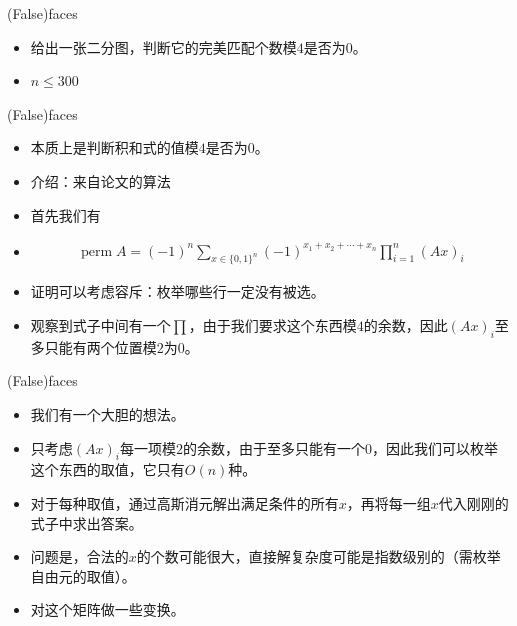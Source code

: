 \documentclass{beamer}
\begin{document}
\begin{frame}{(False)faces}
    \begin{itemize}
        \item 给出一张二分图，判断它的完美匹配个数模$4$是否为$0$。
        \item $n\leq 300$
    \end{itemize}
\end{frame}

\begin{frame}{(False)faces}
    \begin{itemize}
        \item 本质上是判断积和式的值模$4$是否为$0$。
        \item 介绍：来自论文的算法
        \item 首先我们有
        \item $$\begin{aligned}
            \operatorname{perm}A=(-1)^n\sum_{x\in\{0,1\}^n}(-1)^{x_1+x_2+\cdots +x_n}\prod_{i=1}^n(Ax)_i
        \end{aligned}$$
        \item 证明可以考虑容斥：枚举哪些行一定没有被选。
        \item 观察到式子中间有一个$\prod$，由于我们要求这个东西模$4$的余数，因此$(Ax)_i$至多只能有两个位置模$2$为$0$。
    \end{itemize}
\end{frame}

\begin{frame}{(False)faces}
    \begin{itemize}
        \item 我们有一个大胆的想法。
        \item 只考虑$(Ax)_i$每一项模$2$的余数，由于至多只能有一个$0$，因此我们可以枚举这个东西的取值，它只有$O(n)$种。
        \item 对于每种取值，通过高斯消元解出满足条件的所有$x$，再将每一组$x$代入刚刚的式子中求出答案。
        \item 问题是，合法的$x$的个数可能很大，直接解复杂度可能是指数级别的（需枚举自由元的取值）。
        \item 对这个矩阵做一些变换。
    \end{itemize}
\end{frame}
\end{document}
